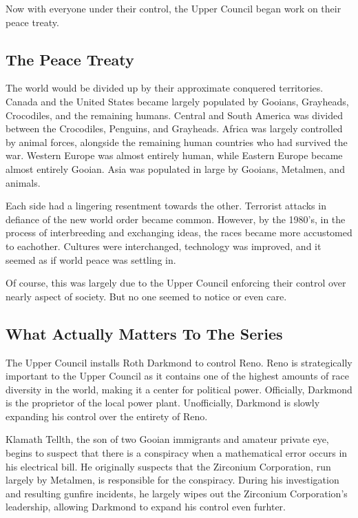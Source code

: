 \documentclass{article}
\begin{document}
Now with everyone under their control, the Upper Council began work on their peace treaty.

\subsection{The Peace Treaty}

The world would be divided up by their approximate conquered territories. Canada and the United States became largely populated by Gooians, Grayheads, Crocodiles, and the remaining humans. Central and South America was divided between the Crocodiles, Penguins, and Grayheads. Africa was largely controlled by animal forces, alongside the remaining human countries who had survived the war. Western Europe was almost entirely human, while Eastern Europe became almost entirely Gooian. Asia was populated in large by Gooians, Metalmen, and animals.

Each side had a lingering resentment towards the other. Terrorist attacks in defiance of the new world order became common. However, by the 1980's, in the process of interbreeding and exchanging ideas, the races became more accustomed to eachother. Cultures were interchanged, technology was improved, and it seemed as if world peace was settling in.

Of course, this was largely due to the Upper Council enforcing their control over nearly aspect of society. But no one seemed to notice or even care.

\subsection{What Actually Matters To The Series}

The Upper Council installs Roth Darkmond to control Reno. Reno is strategically important to the Upper Council as it contains one of the highest amounts of race diversity in the world, making it a center for political power. Officially, Darkmond is the proprietor of the local power plant. Unofficially, Darkmond is slowly expanding his control over the entirety of Reno.

Klamath Tellth, the son of two Gooian immigrants and amateur private eye, begins to suspect that there is a conspiracy when a mathematical error occurs in his electrical bill. He originally suspects that the Zirconium Corporation, run largely by Metalmen, is responsible for the conspiracy. During his investigation and resulting gunfire incidents, he largely wipes out the Zirconium Corporation's leadership, allowing Darkmond to expand his control even furhter.
\end{document}
